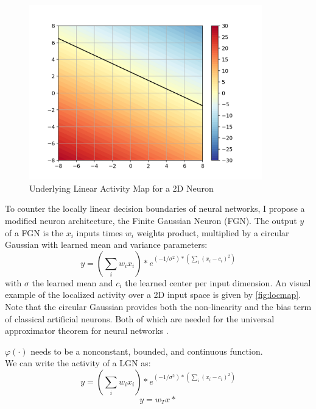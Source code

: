 \documentclass[12pt,oneside]{CUNY_PhD}
\begin{document}
\begin{figure}[htb]
\centering
\includegraphics[width=0.9\textwidth]{images/2d_linear_map.png}
\caption{Underlying Linear Activity Map for a 2D Neuron}
\label{fig:linmap}
\end{figure}

To counter the locally linear decision boundaries of neural networks, I propose a modified neuron architecture, the Finite Gaussian Neuron (FGN). The output $y$ of a FGN is the $x_i$ inputs times $w_i$ weights product, multiplied by a circular Gaussian with learned mean and variance parameters:
\[ y = (\sum_{i}w_i x_i)*e^{(-1/\sigma^2)*(\sum_{i}(x_i-c_i)^2)} \]
with $\sigma$ the learned mean and $c_i$ the learned center per input dimension. An visual example of the localized activity over a 2D input space is given by \ref{fig:locmap}. \\
Note that the circular Gaussian provides both the non-linearity and the bias term of classical artificial neurons. Both of which are needed for the universal approximator theorem for neural networks \cite{}.

$\varphi (\cdot )$ needs to be a nonconstant, bounded, and continuous function.\\
We can write the activity of a LGN as:
\[ y = (\sum_{i}w_i x_i)*e^{(-1/\sigma^2)*(\sum_{i}(x_i-c_i)^2)}\]
\[y = w_Tx * \]
\end{document}

